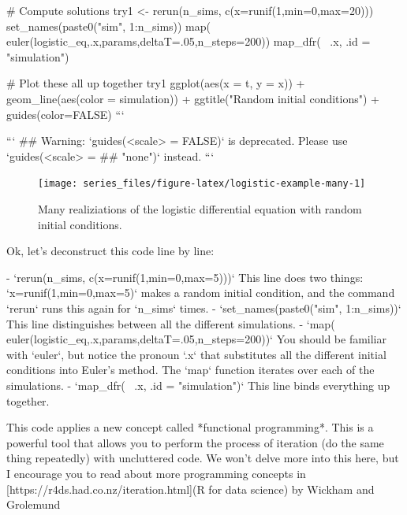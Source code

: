 \documentclass[
]{book}
\theoremstyle{definition}
\theoremstyle{definition}
\theoremstyle{definition}
\theoremstyle{remark}
\begin{document}
# Compute solutions
try1 <- rerun(n_sims, c(x=runif(1,min=0,max=20))) %
  set_names(paste0("sim", 1:n_sims)) %
  map(~ euler(logistic_eq,.x,params,deltaT=.05,n_steps=200)) %
  map_dfr(~ .x, .id = "simulation")


# Plot these all up together
try1 %
  ggplot(aes(x = t, y = x)) +
  geom_line(aes(color = simulation)) +
  ggtitle("Random initial conditions") +
  guides(color=FALSE)
```

```
## Warning: `guides(<scale> = FALSE)` is deprecated. Please use `guides(<scale> =
## "none")` instead.
```

\begin{figure}

{\centering \texttt{[image: series\_files/figure-latex/logistic-example-many-1]} 

}

\caption{Many realiziations of the logistic differential equation with random initial conditions.}\label{fig:logistic-example-many}
\end{figure}

Ok, let's deconstruct this code line by line:

-   `rerun(n_sims, c(x=runif(1,min=0,max=5)))` This line does two things: `x=runif(1,min=0,max=5)` makes a random initial condition, and the command `rerun` runs this again for `n_sims` times.
-   `set_names(paste0("sim", 1:n_sims))` This line distinguishes between all the different simulations.
-   `map(~ euler(logistic_eq,.x,params,deltaT=.05,n_steps=200))` You should be familiar with `euler`, but notice the pronoun `.x` that substitutes all the different initial conditions into Euler's method. The `map` function iterates over each of the simulations.
-   `map_dfr(~ .x, .id = "simulation")` This line binds everything up together.

This code applies a new concept called *functional programming*.  This is a powerful tool that allows you to perform the process of iteration (do the same thing repeatedly) with uncluttered code. We won't delve more into this here, but I encourage you to read about more programming concepts in [https://r4ds.had.co.nz/iteration.html](R for data science) by Wickham and Grolemund
\end{document}
